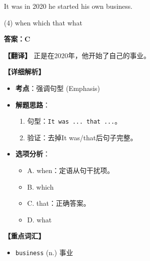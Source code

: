 \documentclass[11pt, a4paper]{article}
\newcommand{\analysis}[4]{
    \begin{solutionbox}
        \textbf{答案：#1}
        
        \textbf{【翻译】} #2
        
        \textbf{【详细解析】}
        #3
        
        \textbf{【重点词汇】}
        #4
    \end{solutionbox}
}
\newcommand{\blank}{\underline{\hspace{1.5cm}}}
\begin{document}
\begin{questions}
    \item It was in 2020 \blank he started his own business.
    \begin{tasks}(4)
        \task when \task which \task that \task what
    \end{tasks}
    \analysis{C}{正是在2020年，他开始了自己的事业。}{
        \begin{itemize}
            \item \textbf{考点}：强调句型 (Emphasis)
            \item \textbf{解题思路}：
                \begin{enumerate}
                    \item 句型：\texttt{It was ... that ...}。
                    \item 验证：去掉It was/that后句子完整。
                \end{enumerate}
            \item \textbf{选项分析}：
                \begin{itemize}
                    \item A. when：定语从句干扰项。
                    \item B. which
                    \item C. that：正确答案。
                    \item D. what
                \end{itemize}
        \end{itemize}
    }{
        \begin{itemize}
            \item \texttt{business} (n.) 事业
        \end{itemize}
    }


\end{questions}
\end{document}
